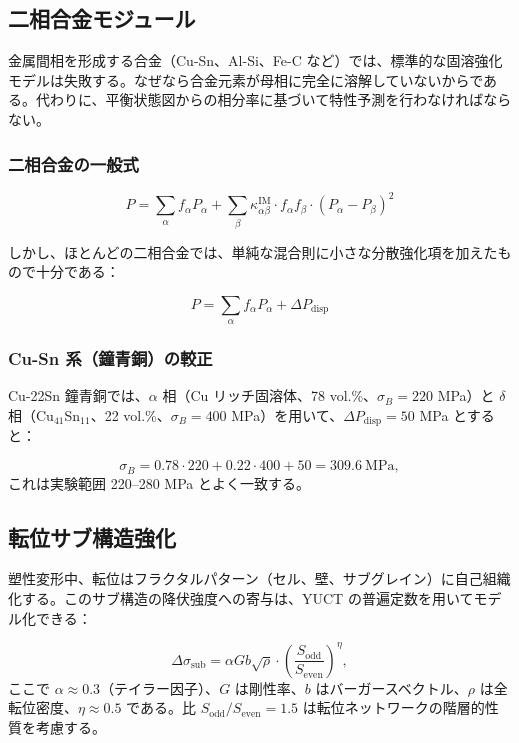 \documentclass[11pt,a4paper]{article}
\theoremstyle{remark}
\begin{document}
	\subsection{二相合金モジュール}
	\label{subsec:two-phase-alloys}
	
	金属間相を形成する合金（Cu-Sn、Al-Si、Fe-C など）では、標準的な固溶強化モデルは失敗する。なぜなら合金元素が母相に完全に溶解していないからである。代わりに、平衡状態図からの相分率に基づいて特性予測を行わなければならない。
	
	\subsubsection{二相合金の一般式}
	
	\begin{equation}
		\boxed{P = \sum_{\alpha} f_{\alpha} P_{\alpha} + \sum_{\beta} \kappa_{\alpha\beta}^{\text{IM}} \cdot f_{\alpha} f_{\beta} \cdot (P_{\alpha} - P_{\beta})^2}
		\label{eq:two-phase-alloy}
	\end{equation}
	
	しかし、ほとんどの二相合金では、単純な混合則に小さな分散強化項を加えたもので十分である：
	
	\begin{equation}
		\boxed{P = \sum_{\alpha} f_{\alpha} P_{\alpha} + \Delta P_{\text{disp}}}
		\label{eq:two-phase-simple}
	\end{equation}
	
	\subsubsection{Cu-Sn 系（鐘青銅）の較正}
	Cu-22Sn 鐘青銅では、\(\alpha\) 相（Cu リッチ固溶体、78 vol.\%、\(\sigma_B=220\) MPa）と \(\delta\) 相（Cu\(_{41}\)Sn\(_{11}\)、22 vol.\%、\(\sigma_B=400\) MPa）を用いて、\(\Delta P_{\text{disp}}=50\) MPa とすると：
	
	\[
	\sigma_B = 0.78 \cdot 220 + 0.22 \cdot 400 + 50 = 309.6\ \text{MPa},
	\]
	これは実験範囲 220–280 MPa とよく一致する。
	
	\subsection{転位サブ構造強化}
	\label{subsec:dislocation-substructure}
	
	塑性変形中、転位はフラクタルパターン（セル、壁、サブグレイン）に自己組織化する。このサブ構造の降伏強度への寄与は、YUCT の普遍定数を用いてモデル化できる：
	
	\[
	\Delta\sigma_{\text{sub}} = \alpha G b \sqrt{\rho} \cdot \left( \frac{S_{\text{odd}}}{S_{\text{even}}} \right)^{\eta},
	\]
	ここで \(\alpha \approx 0.3\)（テイラー因子）、\(G\) は剛性率、\(b\) はバーガースベクトル、\(\rho\) は全転位密度、\(\eta \approx 0.5\) である。比 \(S_{\text{odd}}/S_{\text{even}}=1.5\) は転位ネットワークの階層的性質を考慮する。
	
\end{document}
